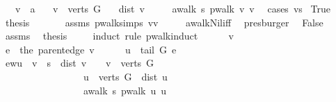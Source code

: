 \begin{isabellebody}
\ \ \ v\ {\isacharcolon}{\isacharcolon}\ {\isacharprime}a\isanewline
\ \ \ {\isachardoublequoteopen}v\ {\isasymin}\ verts\ G{\isachardoublequoteclose}\isanewline
\ \ \ {\isachardoublequoteopen}dist\ v\ {\isasymnoteq}\ {\isasyminfinity}{\isachardoublequoteclose}\isanewline
\ \ \ {\isachardoublequoteopen}awalk\ s\ {\isacharparenleft}pwalk\ v{\isacharparenright}\ v{\isachardoublequoteclose}\ \isanewline
%
\isadelimproof
%
\endisadelimproof
%
\isatagproof
{}\isamarkupfalse%
\ {\isacharparenleft}cases\ {\isachardoublequoteopen}v{\isacharequal}s{\isachardoublequoteclose}{\isacharparenright}\isanewline
{}\isamarkupfalse%
\ True\isanewline
\ \ \isamarkupfalse%
\ {\isacharquery}thesis\ \isanewline
\ \ \ \ \isamarkupfalse%
\ assms\ pwalk{\isachardot}simps{\isacharbrackleft}\ v{\isacharequal}v{\isacharbrackright}\ \isanewline
\ \ \ \ awalk{\isacharunderscore}Nil{\isacharunderscore}iff\ \isamarkupfalse%
\ presburger\ \isanewline
{}\isamarkupfalse%
\isanewline
{}\isamarkupfalse%
\ False\isanewline
\ \ \isamarkupfalse%
\ assms\ \isamarkupfalse%
\ {\isacharquery}thesis\ \isanewline
\ \ \isamarkupfalse%
\ {\isacharparenleft}induct\ rule{\isacharcolon}\ pwalk{\isachardot}induct{\isacharparenright}\isanewline
\ \ \ \ \isamarkupfalse%
\ v\ \isanewline
\ \ \ \ \isamarkupfalse%
\ {\isacharquery}e\ {\isacharequal}\ {\isachardoublequoteopen}the\ {\isacharparenleft}parent{\isacharunderscore}edge\ v{\isacharparenright}{\isachardoublequoteclose}\isanewline
\ \ \ \ \isamarkupfalse%
\ {\isacharquery}u\ {\isacharequal}\ {\isachardoublequoteopen}tail\ G\ {\isacharquery}e{\isachardoublequoteclose}\isanewline
\ \ \ \ \isamarkupfalse%
\ ewu{\isacharcolon}\ {\isachardoublequoteopen}{\isasymnot}\ {\isacharparenleft}v\ {\isacharequal}\ s\ {\isasymor}\ dist\ v\ {\isacharequal}\ {\isasyminfinity}\ {\isasymor}\ v\ {\isasymnotin}\ verts\ G{\isacharparenright}\ {\isasymLongrightarrow}\ \isanewline
\ \ \ \ \ \ \ \ \ \ \ \ \ \ \ \ \ {\isacharquery}u\ {\isasymin}\ verts\ G\ {\isasymLongrightarrow}\ dist\ {\isacharquery}u\ {\isasymnoteq}\ {\isasyminfinity}\ {\isasymLongrightarrow}\ \isanewline
\ \ \ \ \ \ \ \ \ \ \ \ \ \ \ \ \ awalk\ s\ {\isacharparenleft}pwalk\ {\isacharquery}u{\isacharparenright}\ {\isacharquery}u{\isachardoublequoteclose}\isanewline
\ \ \ \ \isamarkupfalse%

\end{isabellebody}
